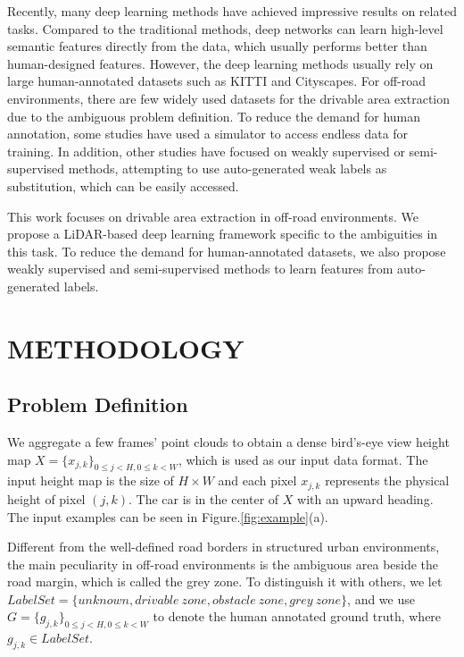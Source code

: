 \documentclass[letterpaper, 10 pt, conference]{ieeeconf}  %
\begin{document}
Recently, many deep learning methods have achieved impressive results on related tasks\cite{barnes2017find}\cite{Han2018}\cite{Oliveira2016}\cite{chen2015deepdriving}\cite{Bellone2018}. Compared to the traditional methods, deep networks can learn high-level semantic features directly from the data, which usually performs better than human-designed features.
However, the deep learning methods usually rely on large human-annotated datasets such as KITTI\cite{geiger2013vision} and Cityscapes\cite{cordts2016cityscapes}. For off-road environments, there are few widely used datasets for the drivable area extraction due to the ambiguous problem definition. 
To reduce the demand for human annotation, some studies have used a simulator to access endless data for training\cite{chen2015deepdriving}. In addition, other studies have focused on weakly supervised\cite{barnes2017find} or semi-supervised methods\cite{Suger2015}, attempting to use auto-generated weak labels as substitution, which can be easily accessed.

This work focuses on drivable area extraction in off-road environments. We propose a LiDAR-based deep learning framework specific to the ambiguities in this task. To reduce the demand for human-annotated datasets, we also propose weakly supervised and semi-supervised methods to learn features from auto-generated labels.

\section{METHODOLOGY}	\label{sec:method}

\subsection{Problem Definition}

We aggregate a few frames' point clouds to obtain a dense bird's-eye view height map $X=\{x_{j,k}\}_{0\le j<H,0\le k<W}$, which is used as our input data format. The input height map is the size of $H\times W$ and each pixel $x_{j,k}$ represents the physical height of pixel $(j,k)$. The car is in the center of $X$ with an upward heading. The input examples can be seen in Figure.\ref{fig:example}(a).

Different from the well-defined road borders in structured urban environments, the main peculiarity in off-road environments is the ambiguous area beside the road margin, which is called the grey zone. To distinguish it with others, we let $Label Set=\{unknown,drivable\ zone,obstacle\ zone,grey\ zone\}$, and we use $G=\{g_{j,k}\}_{0\le j<H,0\le k<W}$ to denote the human annotated ground truth, where $g_{j,k}\in LabelSet$.
\end{document}
